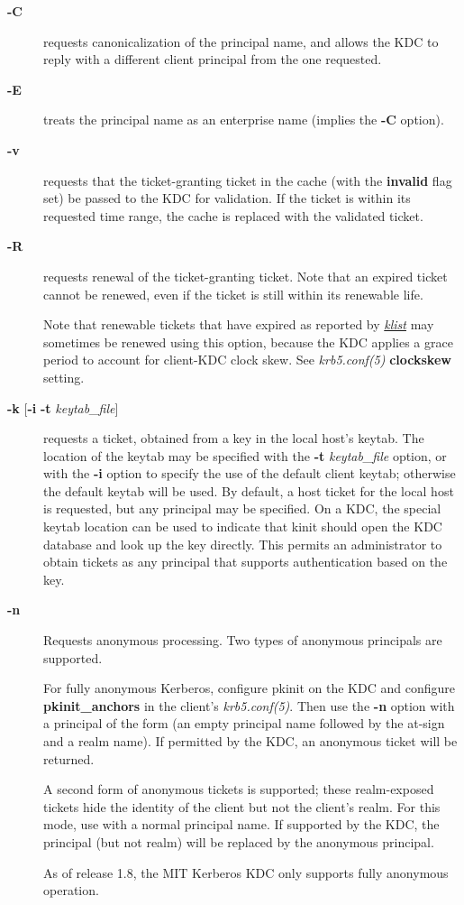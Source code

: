 \documentclass[letterpaper,10pt,english]{sphinxmanual}
\begin{document}
\begin{description}
\item[{\textbf{-C}}] \leavevmode
requests canonicalization of the principal name, and allows the
KDC to reply with a different client principal from the one
requested.

\item[{\textbf{-E}}] \leavevmode
treats the principal name as an enterprise name (implies the
\textbf{-C} option).

\item[{\textbf{-v}}] \leavevmode
requests that the ticket-granting ticket in the cache (with the
\textbf{invalid} flag set) be passed to the KDC for validation.  If the
ticket is within its requested time range, the cache is replaced
with the validated ticket.

\item[{\textbf{-R}}] \leavevmode
requests renewal of the ticket-granting ticket.  Note that an
expired ticket cannot be renewed, even if the ticket is still
within its renewable life.

Note that renewable tickets that have expired as reported by
{\hyperref[user/user_commands/klist:klist-1]{\emph{klist}}} may sometimes be renewed using this option,
because the KDC applies a grace period to account for client-KDC
clock skew.  See \emph{krb5.conf(5)} \textbf{clockskew} setting.

\item[{\textbf{-k} {[}\textbf{-i} \textbar{} \textbf{-t} \emph{keytab\_file}{]}}] \leavevmode
requests a ticket, obtained from a key in the local host's keytab.
The location of the keytab may be specified with the \textbf{-t}
\emph{keytab\_file} option, or with the \textbf{-i} option to specify the use
of the default client keytab; otherwise the default keytab will be
used.  By default, a host ticket for the local host is requested,
but any principal may be specified.  On a KDC, the special keytab
location  can be used to indicate that kinit should open
the KDC database and look up the key directly.  This permits an
administrator to obtain tickets as any principal that supports
authentication based on the key.

\item[{\textbf{-n}}] \leavevmode
Requests anonymous processing.  Two types of anonymous principals
are supported.

For fully anonymous Kerberos, configure pkinit on the KDC and
configure \textbf{pkinit\_anchors} in the client's \emph{krb5.conf(5)}.
Then use the \textbf{-n} option with a principal of the form 
(an empty principal name followed by the at-sign and a realm
name).  If permitted by the KDC, an anonymous ticket will be
returned.

A second form of anonymous tickets is supported; these
realm-exposed tickets hide the identity of the client but not the
client's realm.  For this mode, use  with a normal
principal name.  If supported by the KDC, the principal (but not
realm) will be replaced by the anonymous principal.

As of release 1.8, the MIT Kerberos KDC only supports fully
anonymous operation.

\end{description}
\end{document}
